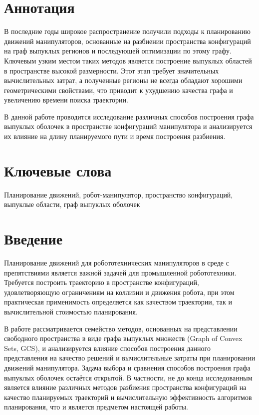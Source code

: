 \documentclass[a4paper,12pt]{extarticle}
\begin{document}
\newpage
\setcounter{page}{2}

{
	\hypersetup{linkcolor=black}
	\tableofcontents
}

\newpage

\newpage
\section*{Аннотация}   %
В последние годы широкое распространение получили подходы к планированию движений манипуляторов, основанные на разбиении пространства конфигураций на граф выпуклых регионов и последующей оптимизации по этому графу. Ключевым узким местом таких методов является построение выпуклых областей в пространстве высокой размерности. Этот этап требует значительных вычислительных затрат, а полученные регионы не всегда обладают хорошими геометрическими свойствами, что приводит к ухудшению качества графа и увеличению времени поиска траектории.

В данной работе проводится исследование различных способов построения графа выпуклых оболочек в пространстве конфигураций манипулятора и анализируется их влияние на длину планируемого пути и время построения разбиения.


\section*{Ключевые слова}
Планирование движений, робот-манипулятор, пространство конфигураций, выпуклые области, граф выпуклых оболочек
\pagebreak


\section{Введение}
Планирование движений для робототехнических манипуляторов в среде с
препятствиями является важной задачей для промышленной 
робототехники. Требуется построить траекторию в пространстве
конфигураций, удовлетворяющую ограничениям на коллизии и движения
робота, при этом практическая применимость определяется как качеством
траектории, так и вычислительной стоимостью планирования.

В работе рассматривается семейство методов, основанных на
представлении свободного пространства в виде графа выпуклых множеств
(Graph of Convex Sets, GCS), и анализируется влияние способов
построения данного представления на качество решений и вычислительные
затраты при планировании движений манипулятора.
Задача выбора и сравнения способов построения графа выпуклых оболочек остаётся открытой. В частности, не до конца исследованным является влияние различных методов разбиения пространства конфигураций на качество планируемых траекторий и вычислительную эффективность алгоритмов планирования, что и является предметом настоящей работы.
\end{document}
